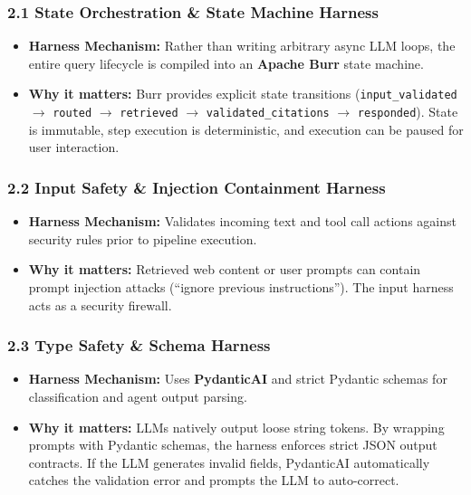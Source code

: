 \documentclass{article}
\begin{document}
\subsubsection{2.1 State Orchestration \& State Machine Harness}
\begin{itemize}
    \item \textbf{Harness Mechanism:} Rather than writing arbitrary async LLM loops, the entire query lifecycle is compiled into an \textbf{Apache Burr} state machine.
    \item \textbf{Why it matters:} Burr provides explicit state transitions (\texttt{input\_validated} $\rightarrow$ \texttt{routed} $\rightarrow$ \texttt{retrieved} $\rightarrow$ \texttt{validated\_citations} $\rightarrow$ \texttt{responded}). State is immutable, step execution is deterministic, and execution can be paused for user interaction.
\end{itemize}

\subsubsection{2.2 Input Safety \& Injection Containment Harness}
\begin{itemize}
    \item \textbf{Harness Mechanism:} Validates incoming text and tool call actions against security rules prior to pipeline execution.
    \item \textbf{Why it matters:} Retrieved web content or user prompts can contain prompt injection attacks (``ignore previous instructions''). The input harness acts as a security firewall.
\end{itemize}

\subsubsection{2.3 Type Safety \& Schema Harness}
\begin{itemize}
    \item \textbf{Harness Mechanism:} Uses \textbf{PydanticAI} and strict Pydantic schemas for classification and agent output parsing.
    \item \textbf{Why it matters:} LLMs natively output loose string tokens. By wrapping prompts with Pydantic schemas, the harness enforces strict JSON output contracts. If the LLM generates invalid fields, PydanticAI automatically catches the validation error and prompts the LLM to auto-correct.
\end{itemize}
\end{document}
